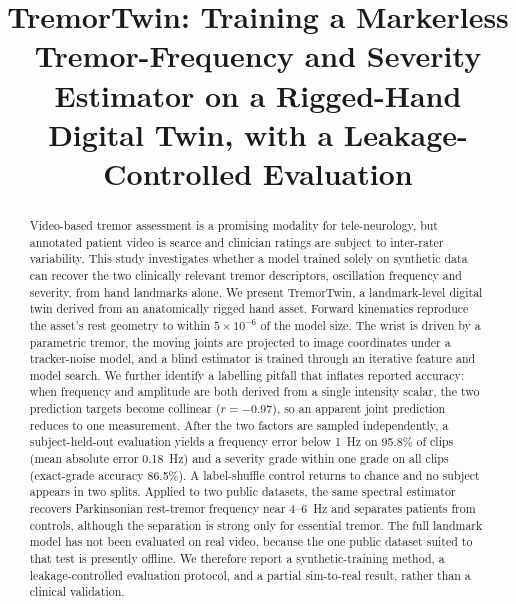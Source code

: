 \documentclass[conference]{IEEEtran}
\begin{document}
\title{TremorTwin: Training a Markerless Tremor-Frequency and Severity Estimator
on a Rigged-Hand Digital Twin, with a Leakage-Controlled Evaluation}

\author{
}

\maketitle

\begin{abstract}
Video-based tremor assessment is a promising modality for tele-neurology, but
annotated patient video is scarce and clinician ratings are subject to
inter-rater variability. This study investigates whether a model trained solely on
synthetic data can recover the two clinically relevant tremor descriptors,
oscillation frequency and severity, from hand landmarks alone. We present
TremorTwin, a landmark-level digital twin derived from an anatomically rigged hand
asset. Forward kinematics reproduce the asset's rest geometry to within
$5\times10^{-6}$ of the model size. The wrist is driven by a parametric tremor,
the moving joints are projected to image coordinates under a tracker-noise model,
and a blind estimator is trained through an iterative feature and model search. We
further identify a labelling pitfall that inflates reported accuracy: when
frequency and amplitude are both derived from a single intensity scalar, the two
prediction targets become collinear ($r=-0.97$), so an apparent joint prediction
reduces to one measurement. After the two factors are sampled independently, a
subject-held-out evaluation yields a frequency error below 1~Hz on 95.8\% of clips
(mean absolute error 0.18~Hz) and a severity grade within one grade on all clips
(exact-grade accuracy 86.5\%). A label-shuffle control returns to chance and no
subject appears in two splits. Applied to two public datasets, the same spectral
estimator recovers Parkinsonian rest-tremor frequency near 4--6~Hz and separates
patients from controls, although the separation is strong only for essential
tremor. The full landmark model has not been evaluated on real video, because the
one public dataset suited to that test is presently offline. We therefore report a
synthetic-training method, a leakage-controlled evaluation protocol, and a partial
sim-to-real result, rather than a clinical validation.
\end{abstract}
\end{document}
